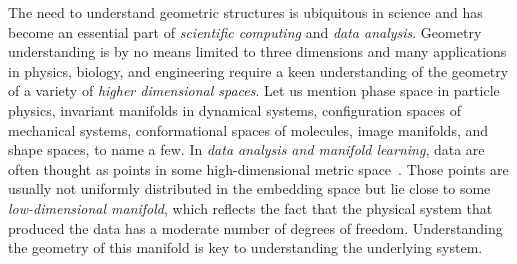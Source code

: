 The need to understand geometric structures is ubiquitous in science
and has become an essential part of {\em scientific computing} and
{\em data analysis}. %
Geometry understanding is by no means limited to
three dimensions and many applications in physics, biology, and
engineering require a keen understanding of the geometry of a variety
of {\em higher dimensional spaces}. Let us mention phase space in particle
physics, invariant manifolds in dynamical systems, configuration
spaces of mechanical systems, conformational spaces of molecules,
image manifolds, and shape spaces, to name a few. In {\em data analysis and manifold learning}, data are often thought as points in some high-dimensional metric space~\cite{dld-hdda-2000}. Those points are usually not uniformly distributed in the embedding space but lie close to some {\em low-dimensional manifold}, which reflects the fact that the physical system that produced the data has a moderate number of degrees of freedom.  
Understanding the geometry of this manifold is key to understanding the underlying system.


